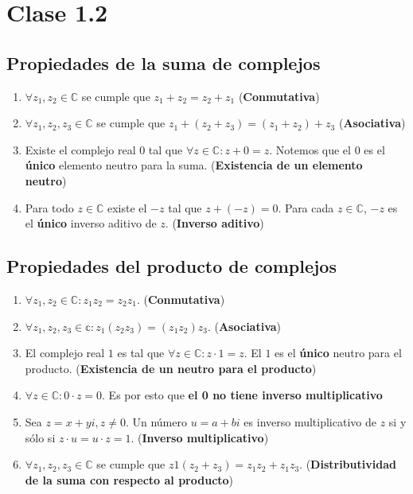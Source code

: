 \documentclass{article}
\begin{document}
\section{Clase 1.2}
\subsection{Propiedades de la suma de complejos}
\begin{enumerate}
    \item $\forall z_1,z_2 \in \mathbb{C}$ se cumple que $z_1+z_2=z_2+z_1$ (\textbf{Conmutativa})
    
    \item $\forall z_1,z_2,z_3 \in \mathbb{C}$ se cumple que $z_1+(z_2+z_3)=(z_1+z_2)+z_3$ (\textbf{Asociativa})
    
    \item Existe el complejo real $0$ tal que $\forall z\in \mathbb{C}:z+0=z$. Notemos que el $0$ es el \textbf{único} elemento neutro para la suma. (\textbf{Existencia de un elemento neutro})
    
    \item Para todo $z\in \mathbb{C}$ existe el $-z$ tal que $z+(-z)=0$. Para cada $z\in \mathbb{C}$, $-z$ es el \textbf{único} inverso aditivo de $z$. (\textbf{Inverso aditivo})
\end{enumerate}
\subsection{Propiedades del producto de complejos}
\begin{enumerate}
    \item $\forall z_1,z_2 \in \mathbb{C} : z_1z_2=z_2z_1$. (\textbf{Conmutativa})
    
    \item $\forall z_1,z_2,z_3\in \mathbb{c}: z_1(z_2z_3)=(z_1z_2)z_3$. (\textbf{Asociativa})
    
    \item El complejo real $1$ es tal que $\forall z \in \mathbb{C}: z \cdot 1=z$. El $1$ es el \textbf{único} neutro para el producto. (\textbf{Existencia de un neutro para el producto})
    
    \item $\forall z\in \mathbb{C}: 0 \cdot z=0$. Es por esto que \textbf{el 0 no tiene inverso multiplicativo}
    
    \item Sea $z=x+yi, z\ne 0$. Un número $u=a+bi$ es inverso multiplicativo de $z$ si y sólo si $z\cdot u=u\cdot z=1$. (\textbf{Inverso multiplicativo})
    
    \item $\forall z_1,z_2,z_3 \in \mathbb{C}$ se cumple que $z1(z_2+z_3)=z_1z_2+z_1z_3$. (\textbf{Distributividad de la suma con respecto al producto})
\end{enumerate}
\end{document}
